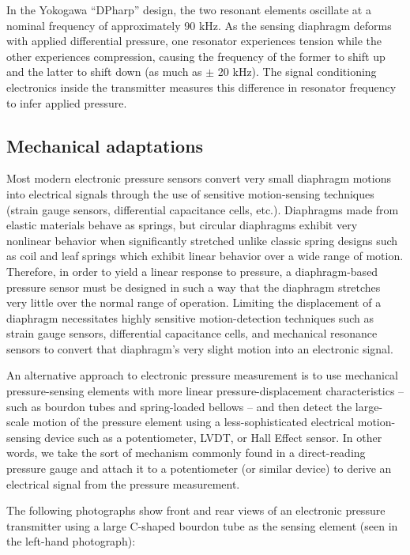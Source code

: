 In the Yokogawa ``DPharp'' design, the two resonant elements oscillate at a nominal frequency of approximately 90 kHz.  As the sensing diaphragm deforms with applied differential pressure, one resonator experiences tension while the other experiences compression, causing the frequency of the former to shift up and the latter to shift down (as much as $\pm$ 20 kHz).  The signal conditioning electronics inside the transmitter measures this difference in resonator frequency to infer applied pressure.





\filbreak
\subsection{Mechanical adaptations}

Most modern electronic pressure sensors convert very small diaphragm motions into electrical signals through the use of sensitive motion-sensing techniques (strain gauge sensors, differential capacitance cells, etc.).  Diaphragms made from elastic materials behave as springs, but circular diaphragms exhibit very nonlinear behavior when significantly stretched unlike classic spring designs such as coil and leaf springs which exhibit linear behavior over a wide range of motion.  Therefore, in order to yield a linear response to pressure, a diaphragm-based pressure sensor must be designed in such a way that the diaphragm stretches very little over the normal range of operation.  Limiting the displacement of a diaphragm necessitates highly sensitive motion-detection techniques such as strain gauge sensors, differential capacitance cells, and mechanical resonance sensors to convert that diaphragm's very slight motion into an electronic signal.

An alternative approach to electronic pressure measurement is to use mechanical pressure-sensing elements with more linear pressure-displacement characteristics -- such as bourdon tubes and spring-loaded bellows -- and then detect the large-scale motion of the pressure element using a less-sophisticated electrical motion-sensing device such as a potentiometer, LVDT, or Hall Effect sensor.  In other words, we take the sort of mechanism commonly found in a direct-reading pressure gauge and attach it to a potentiometer (or similar device) to derive an electrical signal from the pressure measurement.  

The following photographs show front and rear views of an electronic pressure transmitter using a large C-shaped bourdon tube as the sensing element (seen in the left-hand photograph):

